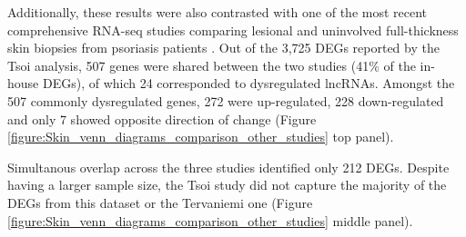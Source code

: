 Additionally, these results were also contrasted with one of the most recent comprehensive RNA-seq studies comparing lesional and uninvolved full-thickness skin biopsies from psoriasis patients \parencite{Tsoi2015}. Out of the 3,725 DEGs reported by the Tsoi analysis, 507 genes were shared between the two studies (41\% of the in-house DEGs), of which 24 corresponded to dysregulated lncRNAs. Amongst the 507 commonly dysregulated genes, 272 were up-regulated, 228 down-regulated and only 7 showed opposite direction of change (Figure \ref{figure:Skin_venn_diagrams_comparison_other_studies} top panel). %

Simultanous overlap across the three studies identified only 212 DEGs. Despite having a larger sample size, the Tsoi study did not capture the majority of the DEGs from this dataset or the Tervaniemi one (Figure \ref{figure:Skin_venn_diagrams_comparison_other_studies} middle panel). %


